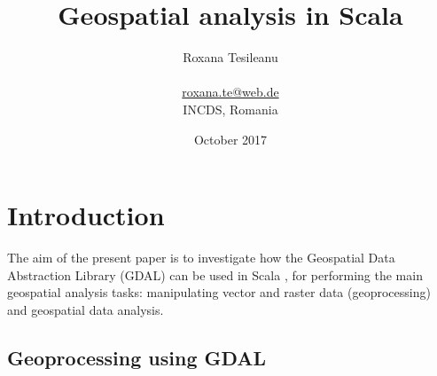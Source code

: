 \documentclass {article}
\title {Geospatial analysis in Scala}
\date {October 2017}
\author {Roxana Tesileanu \\
\\
\href{mailto: roxana.te@web.de}{roxana.te@web.de} \\
INCDS, Romania}
\begin{document}
	\maketitle
\tableofcontents

\newpage
{}
\section {Introduction}

The aim of the present paper is to investigate how the Geospatial Data Abstraction Library (GDAL) \cite{osgeo_gdal_nodate} can be used in Scala \cite{epfl_scala_2017}, for performing the main geospatial analysis tasks: manipulating vector and raster data (geoprocessing) and geospatial data analysis.
  
\subsection {Geoprocessing using GDAL}
\end{document}
